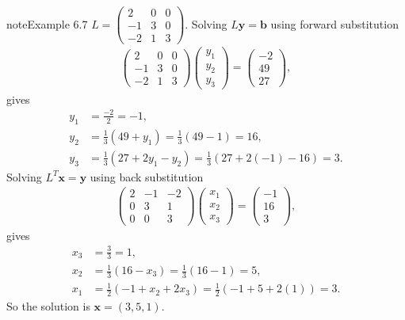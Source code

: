 \documentclass[letterpaper,10pt,english]{jupyterBook}
\begin{document}
\begin{sphinxadmonition}{note}{Example 6.7}
\sphinxAtStartPar
\(L=\begin{pmatrix} 2 & 0 & 0 \\ -1 & 3 & 0 \\ -2 & 1 & 3 \end{pmatrix}\). Solving \(L\mathbf{y}=\mathbf{b}\) using forward substitution
\begin{align*}
    \begin{pmatrix}
        2 & 0 & 0\\
        -1 & 3 & 0\\
        -2 & 1 & 3
    \end{pmatrix}
    \begin{pmatrix} y_1 \\ y_2 \\ y_3 \end{pmatrix} =
    \begin{pmatrix} -2 \\ 49 \\ 27 \end{pmatrix},
\end{align*}
\sphinxAtStartPar
gives
\begin{align*}
    y_1 &=\frac{-2}{2}=-1,\\
    y_2 &=\frac{1}{3}(49+y_1 )=\frac{1}{3}(49-1)=16,\\
    y_3 &=\frac{1}{3}(27+2y_1 -y_2 )=\frac{1}{3}(27+2(-1)-16)=3.
\end{align*}
\sphinxAtStartPar
Solving \(L^T \mathbf{x}=\mathbf{y}\) using back substitution
\begin{align*}
    \begin{pmatrix}
        2 & -1 & -2\\
        0 & 3 & 1\\
        0 & 0 & 3
    \end{pmatrix}
    \begin{pmatrix} x_1 \\ x_2 \\ x_3 \end{pmatrix} =
    \begin{pmatrix} -1 \\ 16 \\ 3 \end{pmatrix},
\end{align*}
\sphinxAtStartPar
gives
\begin{align*}
    x_3 &=\frac{3}{3}=1,\\
    x_2 &=\frac{1}{3}(16-x_3 )=\frac{1}{3}(16-1)=5,\\
    x_1 &=\frac{1}{2}(-1+x_2 +2x_3 )=\frac{1}{2}(-1+5+2(1))=3.
\end{align*}
\sphinxAtStartPar
So the solution is \(\mathbf{x}=(3,5,1)\).
\end{sphinxadmonition}
\end{document}
